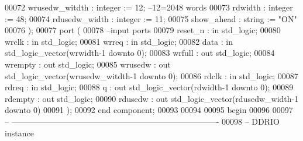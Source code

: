 \begin{DoxyCode}
00072           wrusedw_witdth  : \textcolor{comment}{integer} := \textcolor{vhdllogic}{}\textcolor{vhdllogic}{12}; \textcolor{keyword}{--12=2048 words }
00073           rdwidth         : \textcolor{comment}{integer} := \textcolor{vhdllogic}{}\textcolor{vhdllogic}{48};
00074           rdusedw_width   : \textcolor{comment}{integer} := \textcolor{vhdllogic}{}\textcolor{vhdllogic}{11};
00075           show_ahead      : \textcolor{comment}{string}  := \textcolor{keyword}{"ON"}
00076   );  
00077   \textcolor{keywordflow}{port} (
00078 \textcolor{keyword}{      --input ports }
00079       reset_n       : \textcolor{keywordflow}{in} \textcolor{comment}{std\_logic};
00080       wrclk         : \textcolor{keywordflow}{in} \textcolor{comment}{std\_logic};
00081       wrreq         : \textcolor{keywordflow}{in} \textcolor{comment}{std\_logic};
00082       data          : \textcolor{keywordflow}{in} \textcolor{comment}{std\_logic\_vector}(wrwidth\textcolor{vhdlchar}{-}\textcolor{vhdllogic}{}\textcolor{vhdllogic}{1} \textcolor{keywordflow}{downto} \textcolor{vhdllogic}{}\textcolor{vhdllogic}{0});
00083       wrfull        : \textcolor{keywordflow}{out} \textcolor{comment}{std\_logic};
00084         wrempty       : \textcolor{keywordflow}{out} \textcolor{comment}{std\_logic};
00085       wrusedw       : \textcolor{keywordflow}{out} \textcolor{comment}{std\_logic\_vector}(wrusedw_witdth\textcolor{vhdlchar}{-}\textcolor{vhdllogic}{}\textcolor{vhdllogic}{1} \textcolor{keywordflow}{downto} \textcolor{vhdllogic}{}\textcolor{vhdllogic}{0});
00086       rdclk          : \textcolor{keywordflow}{in} \textcolor{comment}{std\_logic};
00087       rdreq         : \textcolor{keywordflow}{in} \textcolor{comment}{std\_logic};
00088       q             : \textcolor{keywordflow}{out} \textcolor{comment}{std\_logic\_vector}(rdwidth\textcolor{vhdlchar}{-}\textcolor{vhdllogic}{}\textcolor{vhdllogic}{1} \textcolor{keywordflow}{downto} \textcolor{vhdllogic}{}\textcolor{vhdllogic}{0});
00089       rdempty       : \textcolor{keywordflow}{out} \textcolor{comment}{std\_logic};
00090       rdusedw       : \textcolor{keywordflow}{out} \textcolor{comment}{std\_logic\_vector}(rdusedw_width\textcolor{vhdlchar}{-}\textcolor{vhdllogic}{}\textcolor{vhdllogic}{1} \textcolor{keywordflow}{downto} \textcolor{vhdllogic}{}\textcolor{vhdllogic}{0})     
00091         );
00092 \textcolor{keywordflow}{end} \textcolor{keywordflow}{component};
00093 
00094   
00095 \textcolor{vhdlkeyword}{begin}
00096 
00097 \textcolor{keyword}{-- ----------------------------------------------------------------------------}
00098 \textcolor{keyword}{-- DDRIO instance}

\end{DoxyCode}
